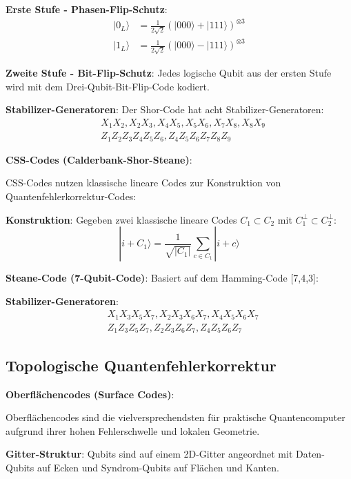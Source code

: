 \documentclass[12pt,a4paper]{article}
\theoremstyle{definition}
\theoremstyle{remark}
\begin{document}
\textbf{Erste Stufe - Phasen-Flip-Schutz}:
\begin{align}
	|0_L\rangle &= \frac{1}{2\sqrt{2}}(|000\rangle + |111\rangle)^{\otimes 3} \\
	|1_L\rangle &= \frac{1}{2\sqrt{2}}(|000\rangle - |111\rangle)^{\otimes 3}
\end{align}

\textbf{Zweite Stufe - Bit-Flip-Schutz}:
Jedes logische Qubit aus der ersten Stufe wird mit dem Drei-Qubit-Bit-Flip-Code kodiert.

\textbf{Stabilizer-Generatoren}:
Der Shor-Code hat acht Stabilizer-Generatoren:
\begin{align}
	&X_1X_2, X_2X_3, X_4X_5, X_5X_6, X_7X_8, X_8X_9 \\
	&Z_1Z_2Z_3Z_4Z_5Z_6, Z_4Z_5Z_6Z_7Z_8Z_9
\end{align}

\textbf{CSS-Codes (Calderbank-Shor-Steane)}:

CSS-Codes nutzen klassische lineare Codes zur Konstruktion von Quantenfehlerkorrektur-Codes:

\textbf{Konstruktion}:
Gegeben zwei klassische lineare Codes $C_1 \subset C_2$ mit $C_1^\perp \subset C_2^\perp$:
\begin{equation}
	|i + C_1\rangle = \frac{1}{\sqrt{|C_1|}} \sum_{c \in C_1} |i + c\rangle
\end{equation}

\textbf{Steane-Code (7-Qubit-Code)}:
Basiert auf dem Hamming-Code [7,4,3]:

\textbf{Stabilizer-Generatoren}:
\begin{align}
	&X_1X_3X_5X_7, X_2X_3X_6X_7, X_4X_5X_6X_7 \\
	&Z_1Z_3Z_5Z_7, Z_2Z_3Z_6Z_7, Z_4Z_5Z_6Z_7
\end{align}

\subsection{Topologische Quantenfehlerkorrektur}

\textbf{Oberfl{\"a}chencodes (Surface Codes)}:

Oberfl{\"a}chencodes sind die vielversprechendsten f{\"u}r praktische Quantencomputer aufgrund ihrer hohen Fehlerschwelle und lokalen Geometrie.

\textbf{Gitter-Struktur}:
Qubits sind auf einem 2D-Gitter angeordnet mit Daten-Qubits auf Ecken und Syndrom-Qubits auf Fl{\"a}chen und Kanten.
\end{document}
